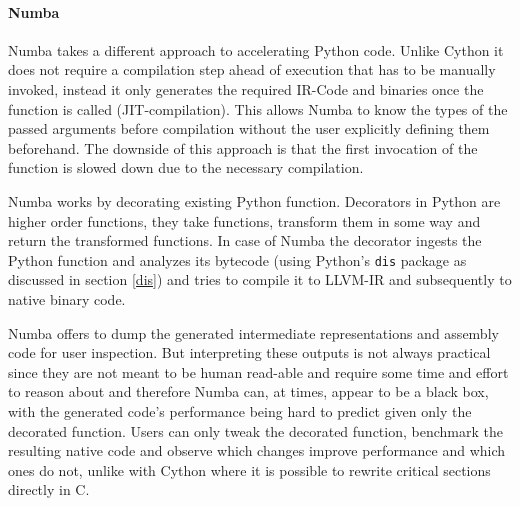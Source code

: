 \documentclass[english,11pt,a4paper,table]{article} %
\begin{document}
\paragraph{Numba}

Numba takes a different approach to accelerating Python code.
Unlike Cython it does not require a compilation step ahead of execution that has to be manually invoked,
instead it only generates the required IR-Code and binaries once the function is called (JIT-compilation).
This allows Numba to know the types of the passed arguments before compilation without the user explicitly defining them beforehand.
The downside of this approach is that the first invocation of the function is slowed down due to the necessary compilation.

Numba works by decorating existing Python function.
Decorators in Python are higher order functions, they take functions, transform them in some way and return the transformed functions.
In case of Numba the decorator ingests the Python function and analyzes its bytecode (using Python's \texttt{dis} package as discussed in section \ref{dis}) and tries to compile it to LLVM-IR and subsequently to native binary code.


Numba offers to dump the generated intermediate representations and assembly code for user inspection.
But interpreting these outputs is not always practical since they are not meant to be human read-able and require some time and effort to reason about and
therefore Numba can, at times, appear to be a black box, with the generated code's performance being hard to predict given only the decorated function.
Users can only tweak the decorated function, benchmark the resulting native code and observe which changes improve performance and which ones do not,
unlike with Cython where it is possible to rewrite critical sections directly in C.
\end{document}
